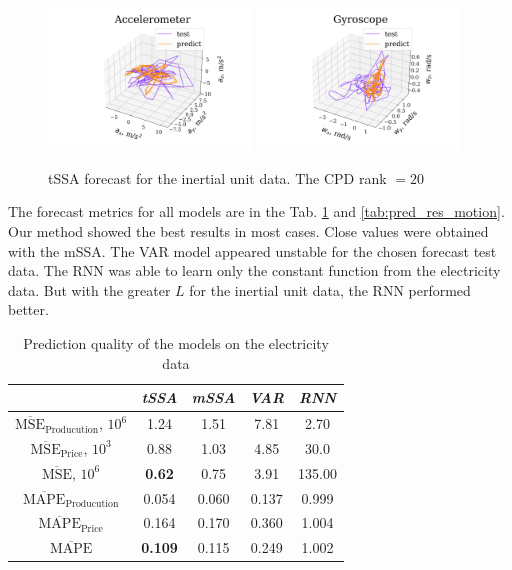 \documentclass[referee, pdflatex, sn-mathphys-num]{sn-jnl}
\theoremstyle{definition}
\theoremstyle{plain}
\begin{document}
	\begin{figure}[h]
		\centering
		\includegraphics[width=0.48\textwidth, keepaspectratio]{acceler_pred.png}
		\includegraphics[width=0.48\textwidth, keepaspectratio]{gyro_pred.png}
		\caption{tSSA forecast for the inertial unit data. The CPD rank $ = 20 $}\label{fig:tssa_motion_pred}
	\end{figure}
	
	The forecast metrics for all models are in the Tab. \ref{tab:pred_res_electr} and \ref{tab:pred_res_motion}. Our method showed the best results in most cases. Close values were obtained with the mSSA. The VAR model appeared unstable for the chosen forecast test data. The RNN was able to learn only the constant function from the electricity data. But with the greater $ L $ for the inertial unit data, the RNN performed better.
	
	\def\arraystretch{1.2}
	\begin{table}[h]
		\centering
		\caption{Prediction quality of the models on the electricity data}\label{tab:pred_res_electr}
		\begin{tabular}{|c|c|c|c|c|}
			\hline
			& \textit{tSSA}  & \textit{mSSA} & \textit{VAR} & \textit{RNN} \\ \hline
			$ \overline{\text{MSE}}_{\text{Producution}} $, $10^6$ & 1.24           & 1.51          & 7.81         & 2.70         \\ \hline
			$ \overline{\text{MSE}}_{\text{Price}} $, $10^3$      & 0.88           & 1.03          & 4.85         & 30.0         \\ \hline
			$ \overline{\text{MSE}} $, $10^6$             & \textbf{0.62}  & 0.75          & 3.91         & 135.00       \\ \hline
			$ \overline{\text{MAPE}}_{\text{Producution}} $        & 0.054          & 0.060         & 0.137        & 0.999        \\ \hline
			$ \overline{\text{MAPE}}_{\text{Price}} $             & 0.164          & 0.170         & 0.360        & 1.004        \\ \hline
			$ \overline{\text{MAPE}} $                    & \textbf{0.109} & 0.115         & 0.249        & 1.002        \\ \hline
		\end{tabular}
	\end{table}
	
\end{document}
